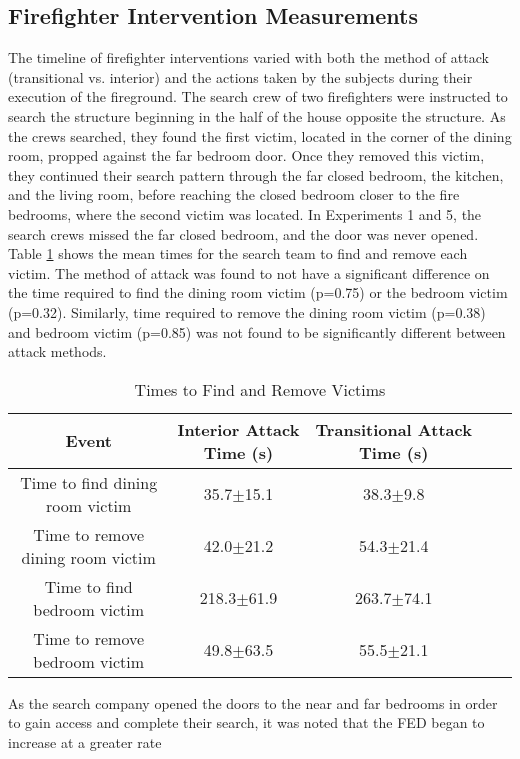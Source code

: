 \documentclass[12pt,oneside]{book}
\begin{document}
\subsection{Firefighter Intervention Measurements}
The timeline of firefighter interventions varied with both the method of attack (transitional vs. interior) and the actions taken by the subjects during their execution of the fireground. The search crew of two firefighters were instructed to search the structure beginning in the half of the house opposite the structure. As the crews searched, they found the first victim, located in the corner of the dining room, propped against the far bedroom door. Once they removed this victim, they continued their search pattern through the far closed bedroom, the kitchen, and the living room, before reaching the closed bedroom closer to the fire bedrooms, where the second victim was located. In Experiments 1 and 5, the search crews missed the far closed bedroom, and the door was never opened. Table \ref{tab:victim_times} shows the mean times for the search team to find and remove each victim. The method of attack was found to not have a significant difference on the time required to find the dining room victim (p=0.75) or the bedroom victim (p=0.32). Similarly, time required to remove the dining room victim (p=0.38) and bedroom victim (p=0.85) was not found to be significantly different between attack methods. 

\begin{table}[!ht]
    \centering
    \caption{Times to Find and Remove Victims}
    \label{tab:victim_times}
    \begin{tabular}{ccccc}
    \toprule[1.5pt]
 	 Event&								Interior Attack Time (s)&	Transitional Attack Time (s)\\
 	\midrule 
  	Time to find dining room victim&	35.7$\pm$15.1&				38.3$\pm$9.8\\
  	Time to remove dining room victim&	42.0$\pm$21.2&				54.3$\pm$21.4\\
  	Time to find bedroom victim&		218.3$\pm$61.9&				263.7$\pm$74.1\\
  	Time to remove bedroom victim&		49.8$\pm$63.5&				55.5$\pm$21.1\\
 	\bottomrule[1.25pt] 
    \end{tabular}
\end{table}

As the search company opened the doors to the near and far bedrooms in order to gain access and complete their search, it was noted that the FED began to increase at a greater rate
\end{document}
